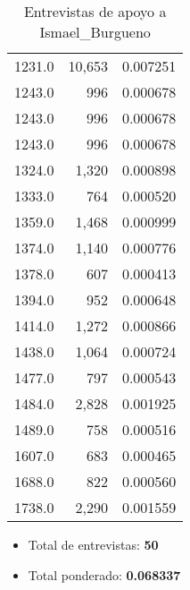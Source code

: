 \documentclass[a4paper,12pt]{article}
\begin{document}
\begin{table}[h]
\begin{tabular}{lrr}
1231.0 & 10,653 & 0.007251 \\ 
1243.0 & 996 & 0.000678 \\ 
1243.0 & 996 & 0.000678 \\ 
1243.0 & 996 & 0.000678 \\ 
1324.0 & 1,320 & 0.000898 \\ 
1333.0 & 764 & 0.000520 \\ 
1359.0 & 1,468 & 0.000999 \\ 
1374.0 & 1,140 & 0.000776 \\ 
1378.0 & 607 & 0.000413 \\ 
1394.0 & 952 & 0.000648 \\ 
1414.0 & 1,272 & 0.000866 \\ 
1438.0 & 1,064 & 0.000724 \\ 
1477.0 & 797 & 0.000543 \\ 
1484.0 & 2,828 & 0.001925 \\ 
1489.0 & 758 & 0.000516 \\ 
1607.0 & 683 & 0.000465 \\ 
1688.0 & 822 & 0.000560 \\ 
1738.0 & 2,290 & 0.001559 \\ 
\bottomrule
\end{tabular}
\caption{Entrevistas de apoyo a Ismael_Burgueno}
\end{table}

\begin{itemize}
\item Total de entrevistas: \textbf{50}
\item Total ponderado: \textbf{0.068337}
\end{itemize}
\end{document}
